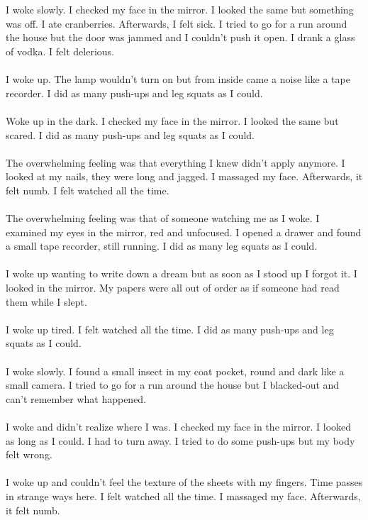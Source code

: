 \documentclass{article}
\begin{document}
    \section{}
    I woke slowly. I checked my face in the mirror. I looked the same but something was off. I ate cranberries. Afterwards, I felt sick. I tried to go for a run around the house but the door was jammed and I couldn't push it open. I drank a glass of vodka. I felt delerious. \\\\I woke up. The lamp wouldn't turn on but from inside came a noise like a tape recorder. I did as many push-ups and leg squats as I could. \\\\Woke up in the dark. I checked my face in the mirror. I looked the same but scared. I did as many push-ups and leg squats as I could. \\\\The overwhelming feeling was that everything I knew didn't apply anymore. I looked at my nails, they were long and jagged. I massaged my face. Afterwards, it felt numb. I felt watched all the time. \\\\The overwhelming feeling was that of someone watching me as I woke. I examined my eyes in the mirror, red and unfocused. I opened a drawer and found a small tape recorder, still running. I did as many leg squats as I could. \\\\I woke up wanting to write down a dream but as soon as I stood up I forgot it. I looked in the mirror. My papers were all out of order as if someone had read them while I slept. \\\\I woke up tired. I felt watched all the time. I did as many push-ups and leg squats as I could. \\\\I woke slowly. I found a small insect in my coat pocket, round and dark like a small camera. I tried to go for a run around the house but I blacked-out and can't remember what happened. \\\\I woke and didn't realize where I was. I checked my face in the mirror. I looked as long as I could. I had to turn away. I tried to do some push-ups but my body felt wrong. \\\\I woke up and couldn't feel the texture of the sheets with my fingers. Time passes in strange ways here. I felt watched all the time. I massaged my face. Afterwards, it felt numb. \\\\
    \newpage
    
\end{document}
